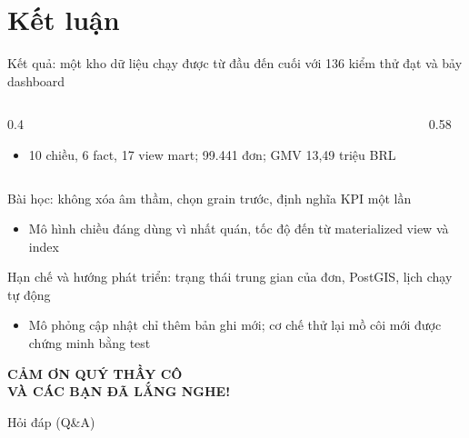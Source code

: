 \section[Kết luận]{Kết luận}

\begin{frame}{Kết quả: một kho dữ liệu chạy được từ đầu đến cuối với 136 kiểm thử đạt và bảy dashboard}
\begin{columns}[T]\begin{column}{0.4\textwidth}
\begin{itemize}
  \item 10 chiều, 6 fact, 17 view mart; 99.441 đơn; GMV 13,49 triệu BRL
\end{itemize}
\end{column}\begin{column}{0.58\textwidth}
\begin{center}\end{center}
\end{column}\end{columns}

\end{frame}

\begin{frame}{Bài học: không xóa âm thầm, chọn grain trước, định nghĩa KPI một lần}
\begin{itemize}
  \item Mô hình chiều đáng dùng vì nhất quán, tốc độ đến từ materialized view và index
\end{itemize}


\end{frame}

\begin{frame}{Hạn chế và hướng phát triển: trạng thái trung gian của đơn, PostGIS, lịch chạy tự động}
\begin{itemize}
  \item Mô phỏng cập nhật chỉ thêm bản ghi mới; cơ chế thử lại mồ côi mới được chứng minh bằng test
\end{itemize}


\end{frame}

\begin{hustdarkframe}
\centering\vspace*{0.14\paperheight}
{\Huge\bfseries\color{white} CẢM ƠN QUÝ THẦY CÔ\\VÀ CÁC BẠN ĐÃ LẮNG NGHE!\par}\vspace{1em}
{\large\color{white!85} Hỏi đáp (Q\&A)\par}
\end{hustdarkframe}
